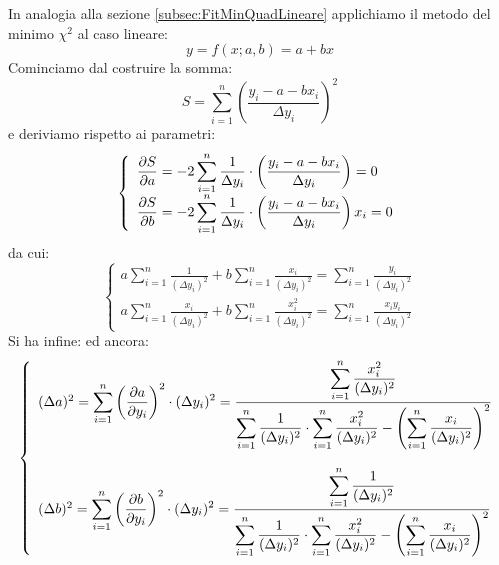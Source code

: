 In analogia alla sezione \ref{subsec:FitMinQuadLineare} applichiamo il
metodo del minimo $\chi^2$ al caso lineare:
$$
y = f(x; a, b) = a + b x
$$
Cominciamo dal costruire la somma:
$$
S = \sum_{i=1}^n\left(\frac{y_i - a - b x_i}{\Delta y_i}\right)^2
$$
e deriviamo rispetto ai parametri:
$$
\left \{ \begin{array}{l}
\displaystyle \frac{\partial S}{\partial a} = -2\sum_{i=1}^{n} \frac{1}{\Delta y_i} \cdot
\left(\frac{y_i-a-b x_i}{\Delta y_i}\right) = 0\\
\displaystyle \frac{\partial S}{\partial b} = -2\sum_{i=1}^{n} \frac{1}{\Delta y_i} \cdot
\left(\frac{y_i-a-b x_i}{\Delta y_i}\right)x_i = 0
\end{array} \right.
$$
da cui:
$$
\left \{ \begin{array}{l}
\displaystyle a \sum_{i=1}^{n} \frac{1}{(\Delta y_i)^2}
+ b \sum_{i=1}^{n} \frac{x_i}{(\Delta y_i)^2} =
\sum_{i=1}^{n} \frac{y_i}{(\Delta y_i)^2}\\
\displaystyle a \sum_{i=1}^{n} \frac{x_i}{(\Delta y_i)^2}
+ b \sum_{i=1}^{n} \frac{x_i^2}{(\Delta y_i)^2} =
\sum_{i=1}^{n} \frac{x_i y_i}{(\Delta y_i)^2}
\end{array} \right.
$$
Si ha infine:
ed ancora:
$$
\left \{ \begin{array}{l}
(\Delta a)^2=
\displaystyle\sum_{i=1}^{n}\left(\displaystyle \frac{\partial a}{\partial y_i}\right)^2
\cdot (\Delta y_i)^2=
\frac{\displaystyle\sum_{i=1}^{n} \frac{x_i^2}{(\Delta y_i)^2}}
{\displaystyle\sum_{i=1}^{n} \frac{1}{(\Delta y_i)^2}\cdot
\sum_{i=1}^{n} \frac{x_i^2}{(\Delta y_i)^2}-
\left(\sum_{i=1}^{n} \frac{x_i}{(\Delta y_i)^2}\right)^2} \\
\\
(\Delta b)^2=
\displaystyle\sum_{i=1}^{n}\left(\displaystyle \frac{\partial b}{\partial y_i}\right)^2
\cdot (\Delta y_i)^2=
\frac{\displaystyle\sum_{i=1}^{n} \frac{1}{(\Delta y_i)^2}}
{\displaystyle\sum_{i=1}^{n} \frac{1}{(\Delta y_i)^2}\cdot
\sum_{i=1}^{n} \frac{x_i^2}{(\Delta y_i)^2}-
\left(\sum_{i=1}^{n} \frac{x_i}{(\Delta y_i)^2}\right)^2}
\end{array} \right.
$$
